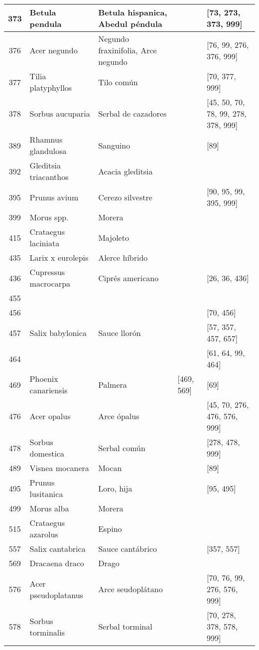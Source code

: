 \begin{landscape}
\begin{longtable}{|c|p{4cm}|p{4cm}|p{4cm}|p{4cm}|}
\hline
373 & Betula pendula & Betula hispanica, Abedul péndula &  & [73, 273, 373, 999] \\
\hline
376 & Acer negundo & Negundo fraxinifolia, Arce negundo &  & [76, 99, 276, 376, 999] \\
\hline
377 & Tilia platyphyllos & Tilo común &  & [70, 377, 999] \\
\hline
378 & Sorbus aucuparia & Serbal de cazadores &  & [45, 50, 70, 78, 99, 278, 378, 999] \\
\hline
389 & Rhamnus glandulosa & Sanguino &  & [89] \\
\hline
392 & Gleditsia triacanthos & Acacia gleditsia &  &  \\
\hline
395 & Prunus avium & Cerezo silvestre &  & [90, 95, 99, 395, 999] \\
\hline
399 & Morus spp. & Morera &  &  \\
\hline
415 & Crataegus laciniata & Majoleto &  &  \\
\hline
435 & Larix x eurolepis & Alerce híbrido &  &  \\
\hline
436 & Cupressus macrocarpa & Ciprés americano &  & [26, 36, 436] \\
\hline
455 &  &  &  &  \\
\hline
456 &  &  &  & [70, 456] \\
\hline
457 & Salix babylonica & Sauce llorón &  & [57, 357, 457, 657] \\
\hline
464 &  &  &  & [61, 64, 99, 464] \\
\hline
469 & Phoenix canariensis & Palmera & [469, 569] & [69] \\
\hline
476 & Acer opalus & Arce ópalus &  & [45, 70, 276, 476, 576, 999] \\
\hline
478 & Sorbus domestica & Serbal común &  & [278, 478, 999] \\
\hline
489 & Visnea mocanera & Mocan &  & [89] \\
\hline
495 & Prunus lusitanica & Loro, hija &  & [95, 495] \\
\hline
499 & Morus alba & Morera &  &  \\
\hline
515 & Crataegus azarolus & Espino &  &  \\
\hline
557 & Salix cantabrica & Sauce cantábrico &  & [357, 557] \\
\hline
569 & Dracaena draco & Drago &  &  \\
\hline
576 & Acer pseudoplatanus & Arce seudoplátano &  & [70, 76, 99, 276, 576, 999] \\
\hline
578 & Sorbus torminalis & Serbal torminal &  & [70, 278, 378, 578, 999] \\

\end{longtable}
\end{landscape}
